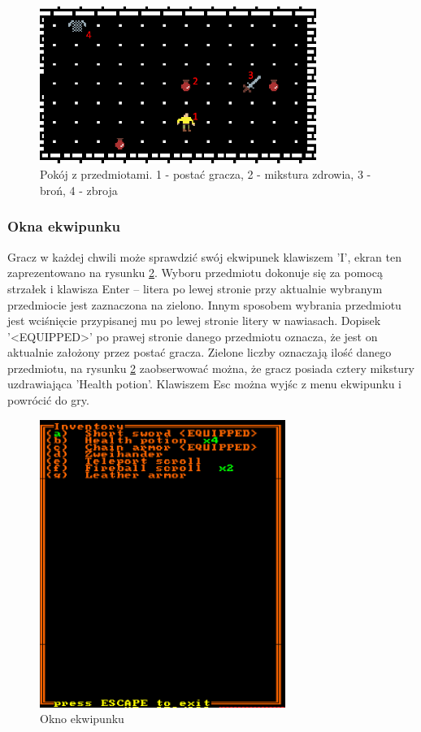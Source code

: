 \documentclass[12pt,twoside]{article}
\begin{document}
\FloatBarrier
\begin{figure}[h]
	\centering
	\includegraphics[width=9cm]{images/mygame/item_room.png}
	\caption{Pokój z przedmiotami. 1 - postać gracza, 2 - mikstura zdrowia, 3 - broń, 4 - zbroja }
	\label{mygame:item_room}
\end{figure}
\FloatBarrier


\subsubsection{Okna ekwipunku}
Gracz w każdej chwili może sprawdzić swój ekwipunek klawiszem 'I', ekran ten zaprezentowano na rysunku \ref{mygame:inv}. Wyboru przedmiotu dokonuje się za pomocą strzałek i klawisza Enter -- litera po lewej stronie przy aktualnie wybranym przedmiocie jest zaznaczona na zielono. Innym sposobem wybrania przedmiotu jest wciśnięcie przypisanej mu po lewej stronie litery w nawiasach. Dopisek '<EQUIPPED>' po prawej stronie danego przedmiotu oznacza, że jest on aktualnie założony przez postać gracza. Zielone liczby oznaczają ilość danego przedmiotu, na rysunku \ref{mygame:inv}  zaobserwować można, że gracz posiada cztery mikstury uzdrawiająca 'Health potion'. Klawiszem Esc można wyjśc z menu ekwipunku i powrócić do gry.

\FloatBarrier
\begin{figure}[h]
	\centering
	\includegraphics[width=8cm]{images/mygame/inv.png}
	\caption{Okno ekwipunku}
	\label{mygame:inv}
\end{figure}
\FloatBarrier
\end{document}
